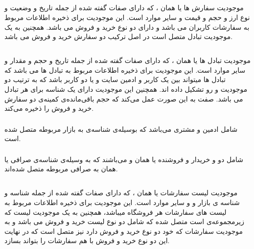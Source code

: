 \documentclass{book}
\begin{document}
\subsection{}
موجودیت سفارش ها یا همان ، که دارای صفات گفته شده از جمله تاریخ و وضعیت و نوع ارز و حجم و قیمت و سایر موارد است. این موجودیت برای ذخیره اطلاعات مربوط به سفارشات کاربران می باشد و دارای دو نوع خرید و فروش می باشد. همچنین به یک موجودیت تبادل متصل است در اصل ترکیب دو سفارش خرید و فروش می باشد.




\subsection{}
موجودیت تبادل ها یا همان ، که دارای صفات گفته شده از جمله تاریخ و حجم و مقدار و سایر موارد است. این موجودیت برای ذخیره اطلاعات مربوط به تبادل ها می باشد که تبادل ها میتواند بین یک کاربر و ادمین سایت و یا دو کاربر باشد که به ترتیب دو موجودیت  و  رو تشکیل داده اند. همچنین این موجودیت دارای یک شناسه برای هر تبادل می باشد. صفت  به این صورت عمل می‌کند که حجم باقی‌مانده‌ی کمینه‌ی دو سفارش خرید و فروش را ذخیره می‌کند.

\subsubsection{}
شامل  ادمین و مشتری می‌باشد که بوسیله‌ی شناسه‌ی  به بازار مربوطه متصل شده است.

\subsubsection{}
شامل دو  و  خریدار و فروشنده یا همان  و  می‌باشند که به وسیله‌ی شناسه‌ی صرافی یا همان  به صرافی مربوطه متصل شده‌اند.



\subsection{}
موجودیت لیست سفارشات یا همان ، که دارای صفات گفته شده از جمله شناسه و  شناسه ی بازار و و سایر موارد است. این موجودیت برای ذخیره اطلاعات مربوط به لیست های سفارشات هر فروشگاه میباشد، همچنین به یک موجودیت لیست که زیرمجموعه‌ی  است متصل شده که شامل دو نوع لیست خرید و فروش می باشد و به موجودیت سفارشات که خود دو نوع خرید و فروش دارد نیز متصل است که در نهایت این دو نوع خرید و فروش با هم سفارشات را بتواند بسازد.
\end{document}
